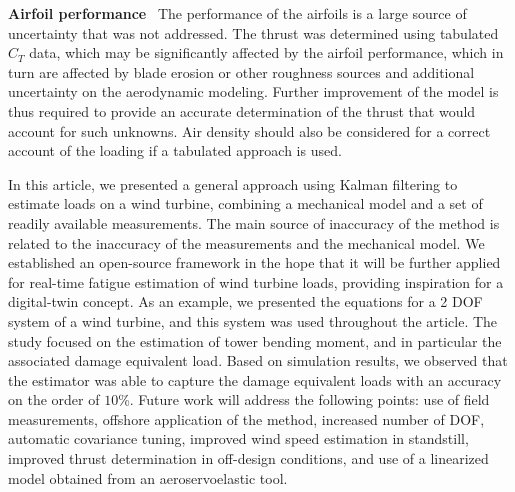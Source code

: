 \documentclass[wes, manuscript]{copernicus}
\newcommand\runinhead[1]{\par\vspace{0.3cm}\noindent\textbf{#1}\ }%
\begin{document}
\runinhead{Airfoil performance}
The performance of the airfoils is a large source of uncertainty that was not addressed. 
The thrust was determined using tabulated $C_T$ data, which may be significantly affected by the airfoil performance, which in turn are affected by blade erosion or other roughness sources and additional uncertainty on the aerodynamic modeling. 
Further improvement of the model is thus required to provide an accurate determination of the thrust that would account for such unknowns.
Air density should also be considered for a correct account of the loading if a tabulated approach is used.




\conclusions
In this article, we presented a general approach using Kalman filtering to estimate loads on a wind turbine, combining a mechanical model and a set of readily available measurements. 
The main source of inaccuracy of the method is related to the inaccuracy of the measurements and the mechanical model. 
We established an open-source framework in the hope that it will be further applied for real-time fatigue estimation of wind turbine loads, providing inspiration for a digital-twin concept.
% 
As an example, we presented the equations for a 2 DOF system of a wind turbine, and this system was used throughout the article. The study focused on the estimation of tower bending moment, and in particular the associated damage equivalent load. Based on simulation results, we observed that the estimator was able to capture the damage equivalent loads with an accuracy on the order of $10$\%.
Future work will address the following points: use of field measurements, offshore application of the method, increased number of DOF, automatic covariance tuning, improved wind speed estimation in standstill, improved thrust determination in off-design conditions, and use of a linearized model obtained from an aeroservoelastic tool.






\end{document}
